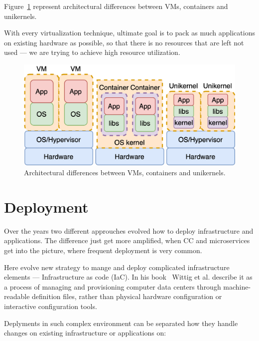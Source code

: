Figure~\ref{fig:fig5} represent architectural differences between VMs, containers and unikernels.

With every virtualization technique, ultimate goal is to pack as much applications on existing hardware as possible, so that there is no resources that are left not used --- we are trying to achieve high resource utilization.

\begin{figure}[H]
	\begin{center}
		\includegraphics[scale=0.9]{images/Figure5.png}
	\end{center}
	\vspace{-0.6cm}
	\caption{Architectural differences between VMs, containers and unikernels.}
	\label{fig:fig5}
\end{figure}
%
%
\section{Deployment}\label{sec:deployment}
%
Over the years two different approuches evolved how to deploy infrastructure and applications. The difference just get more amplified, when CC and microservices get into the picture, where frequent deployment is very common. 

Here evolve new strategy to mange and deploy complicated infrastructure elements --- Infrastructure as code (IaC). In his book~\cite{wittig2018amazon} Wittig et al. describe it as a process of managing and provisioning computer data centers through machine-readable definition files, rather than physical hardware configuration or interactive configuration tools.

Deplyments in such complex environment can be separated how they handle changes on existing infrastructure or applications on:

